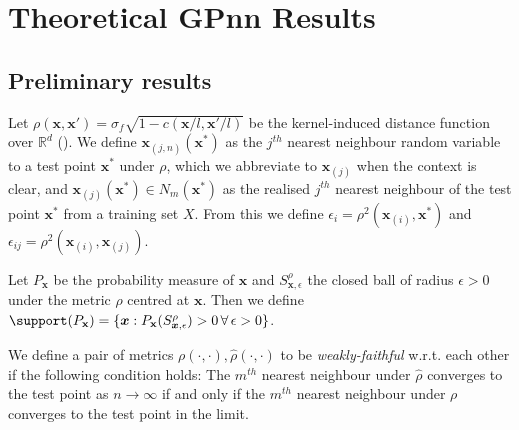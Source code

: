 \section{Theoretical GPnn Results}
\label{detailed_proofs}

\label{appx:gpnn}
\subsection{Preliminary results}
    Let \(\rho(\bm{x},\bm{x'})=\sigma_f\sqrt{1-c(\bm{x}/l,\bm{x'}/l)}\) be the kernel-induced distance function over \(\mathbb{R}^d\) (\cite{Scholkopf2001}).
    We define \(\mathbf{x}_{(j,n)}(\bm{x}^*)\) as the \(j^{th}\) nearest neighbour random variable to a test point \(\bm{x}^*\) under \(\rho\), which we abbreviate to \(\mathbf{x}_{(j)}\) when the context is clear, and \(\bm{x}_{(j)}(\bm{x}^*) \in N_m(\bm{x}^*)\) as the realised \(j^{th}\)
    nearest neighbour of the test point \(\bm{x}^*\) from a training set \(X\). From this we define \(\epsilon_i = \rho^2(\mathbf{x}_{(i)},\bm{x}^*)\) and \(\epsilon_{ij} = \rho^2(\mathbf{x}_{(i)},\mathbf{x}_{(j)})\).

\begin{definition}[Support]\label{def:support}
    Let \(P_\mathbf{x}\) be the probability measure of \(\mathbf{x}\) and \(S^\rho_{\bm{x},\epsilon}\) the closed ball of radius \(\epsilon>0\) under the metric \(\rho\) centred at \(\bm{x}\). Then we define \(\support(P_\mathbf{x}) = \{\bm{x} : P_\mathbf{x}(S^\rho_{\bm{x},\epsilon})>0\, \forall\,\epsilon >0\}\).
\end{definition}

\begin{definition}\label{def:weakly_faithful}
    We define a pair of metrics \(\rho(\cdot,\cdot),\hat{\rho}(\cdot,\cdot)\) to be \emph{weakly-faithful} w.r.t. each other if the following condition holds: The \(m^{th}\) nearest neighbour under \(\hat{\rho}\) converges to the test point as \(n\rightarrow\infty\) if and only if the \(m^{th}\) nearest neighbour under \(\rho\) converges to the test point in the limit.
\end{definition}

